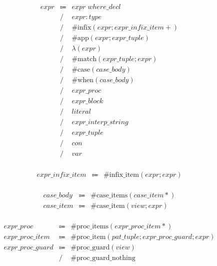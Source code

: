 \begin{align*}
    \begin{array}{rcll}
        \mathit{expr}
        &\Coloneq &\mathit{expr}\; \mathit{where\_decl} \\
        &\mathrel{/} &\mathit{expr}: \mathit{type} \\
        &\mathrel{/} &\mathrm{\#infix}(\mathit{expr}; \mathit{expr\_infix\_item}{+}) \\
        &\mathrel{/} &\mathrm{\#app}(\mathit{expr}; \mathit{expr\_tuple}) \\
        &\mathrel{/} &\lambda(\mathit{expr}) \\
        &\mathrel{/} &\mathrm{\#match}(\mathit{expr\_tuple}; \mathit{expr}) \\
        &\mathrel{/} &\mathrm{\#case}(\mathit{case\_body}) \\
        &\mathrel{/} &\mathrm{\#when}(\mathit{case\_body}) \\
        &\mathrel{/} &\mathit{expr\_proc} \\
        &\mathrel{/} &\mathit{expr\_block} \\
        &\mathrel{/} &\mathit{literal} \\
        &\mathrel{/} &\mathit{expr\_interp\_string} \\
        &\mathrel{/} &\mathit{expr\_tuple} \\
        &\mathrel{/} &\mathit{con} \\
        &\mathrel{/} &\mathit{var}
    \end{array}
\end{align*}

\begin{align*}
    \begin{array}{rcll}
        \mathit{expr\_infix\_item}
        &\Coloneq &\mathrm{\#infix\_item}(\mathit{expr}; \mathit{expr})
    \end{array}
\end{align*}

\begin{align*}
    \begin{array}{rcll}
        \mathit{case\_body}
        &\Coloneq &\mathrm{\#case\_items}(\mathit{case\_item}{*}) \\
        \mathit{case\_item}
        &\Coloneq &\mathrm{\#case\_item}(\mathit{view}; \mathit{expr})
    \end{array}
\end{align*}

\begin{align*}
    \begin{array}{rcll}
        \mathit{expr\_proc}
        &\Coloneq &\mathrm{\#proc\_items}(\mathit{expr\_proc\_item}{*}) \\
        \mathit{expr\_proc\_item}
        &\Coloneq &\mathrm{\#proc\_item}(\mathit{pat\_tuple}; \mathit{expr\_proc\_guard}; \mathit{expr}) \\
        \mathit{expr\_proc\_guard}
        &\Coloneq &\mathrm{\#proc\_guard}(\mathit{view}) \\
        &\mathrel{/} &\mathrm{\#proc\_guard\_nothing}
    \end{array}
\end{align*}

